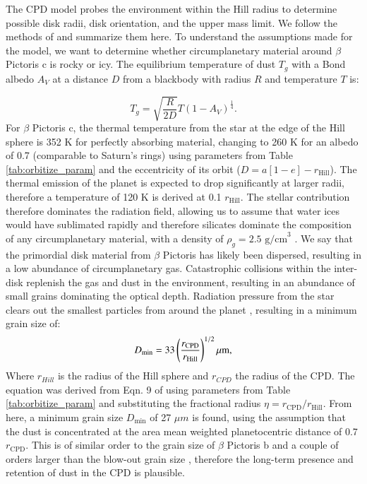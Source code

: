 \documentclass{aa}
\newcommand\picb{$\beta$ Pictoris b}
\newcommand\picc{$\beta$ Pictoris c}
\newcommand\pic{$\beta$ Pictoris}
\begin{document}
	The CPD model probes the environment within the Hill radius to determine possible disk radii, disk orientation, and the upper mass limit.
	We follow the methods of \citet{Kenworthy_2021} and summarize them here.
	To understand the assumptions made for the model, we want to determine whether circumplanetary material around \picc{} is rocky or icy. 
	The equilibrium temperature of dust $T_g$ with a Bond albedo $A_V$ at a distance $D$ from a blackbody with radius $R$ and temperature $T$ is:
	
	\begin{equation}
		T_g = \sqrt{\frac{R}{2D}}T (1-A_V)^\frac{1}{4}.
	\end{equation}
	For \picc{}, the thermal temperature from the star at the edge of the Hill sphere is 352 K for perfectly absorbing material, changing to 260 K for an albedo of 0.7 (comparable to Saturn's rings) using parameters from Table \ref{tab:orbitize_param} and the eccentricity of its orbit ($D = a[1-e]-r_{\text{Hill}}$).  
	The thermal emission of the planet is expected to drop significantly at larger radii, therefore a temperature of 120 K is derived at 0.1 $r_{\text{Hill}}$.
	The stellar contribution therefore dominates the radiation field, allowing us to assume that water ices would have sublimated rapidly and therefore silicates dominate the composition of any circumplanetary material, with a density of $\rho_g =\text{2.5 g/cm}^3$ \citep{Chen_Jura_2001,Li_1997}.
	We say that the primordial disk material from \pic{} has likely been dispersed, resulting in a low abundance of circumplanetary gas.  
	Catastrophic collisions within the inter-disk replenish the gas and dust in the environment, resulting in an abundance of small grains dominating the optical depth.
	Radiation pressure from the star clears out the smallest particles from around the planet \citep{Kennedy_2011}, resulting in a minimum grain size of:
	\begin{equation}
		D_{\text{min}} = 33 \left(\frac{r_{\text{\text{CPD}}}}{r_{\text{Hill}}}\right)^{1/2}  \mu \text{m},
		\label{eq:Mass}
	\end{equation}
	Where $r_{Hill}$ is the radius of the Hill sphere and $r_{CPD}$ the radius of the CPD.
	The equation was derived from Eqn. 9 of \citet{Kennedy_2011} using parameters from Table \ref{tab:orbitize_param} and substituting the fractional radius $\eta = r_{\text{CPD}}/r_{\text{Hill}}$.
	From here, a minimum grain size $D_{\text{min}}$ of 27 $\mu m$ is found, using the assumption that the dust is concentrated at the area mean weighted planetocentric distance of 0.7 $r_{\text{CPD}}$.
	This is of similar order to the grain size of \picb{} and a couple of orders larger than the blow-out grain size \citep{Kenworthy_2021}, therefore the long-term presence and retention of dust in the CPD is plausible. 
	
\end{document}
